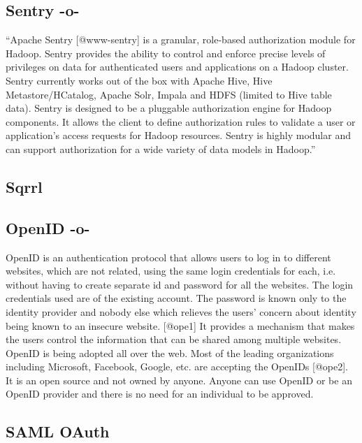 \subsection{Sentry -o-}

``Apache Sentry [@www-sentry] is a granular, role-based
authorization module for Hadoop. Sentry provides the ability to
control and enforce precise levels of privileges on data for
authenticated users and applications on a Hadoop cluster. Sentry
currently works out of the box with Apache Hive, Hive
Metastore/HCatalog, Apache Solr, Impala and HDFS (limited to Hive
table data). Sentry is designed to be a pluggable authorization engine
for Hadoop components. It allows the client to define authorization
rules to validate a user or application's access requests for Hadoop
resources. Sentry is highly modular and can support authorization for
a wide variety of data models in Hadoop.''

\subsection{Sqrrl}
\subsection{OpenID -o-}

OpenID is an authentication protocol that allows users to log in to
different websites, which are not related, using the same login
credentials for each, i.e. without having to create separate id and
password for all the websites. The login credentials used are of the
existing account. The password is known only to the identity provider
and nobody else which relieves the users' concern about identity being
known to an insecure website. [@ope1] It provides a mechanism that
makes the users control the information that can be shared among
multiple websites. OpenID is being adopted all over the web. Most of
the leading organizations including Microsoft, Facebook, Google,
etc. are accepting the OpenIDs [@ope2]. It is an open source and
not owned by anyone. Anyone can use OpenID or be an OpenID provider
and there is no need for an individual to be approved.

\subsection{SAML OAuth}


